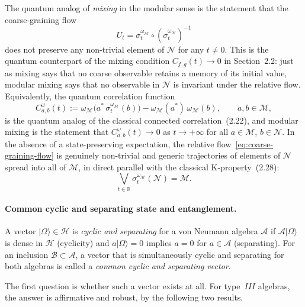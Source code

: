 \documentclass[a4paper,11pt]{article}
\theoremstyle{definition}
\begin{document}
The quantum analog of \emph{mixing} in the modular sense is the statement that the
coarse-graining flow
\begin{equation}
  U_t = \sigma_t^{\omega_\mathcal{M}}\circ(\sigma_t^{\omega_\mathcal{N}})^{-1}
  \label{eq:coarse-graining-flow}
\end{equation}
does not preserve any non-trivial element of $\mathcal{N}$ for any $t\neq 0$.  This is
the quantum counterpart of the mixing condition $C_{f,g}(t)\to 0$ in Section~2.2: just
as mixing says that no coarse observable retains a memory of its initial value, modular
mixing says that no observable in $\mathcal{N}$ is invariant under the relative flow.
Equivalently, the quantum correlation function
\begin{equation}
  C_{a,b}^{\omega}(t) := \omega_\mathcal{M}\bigl(a^*\,\sigma_t^{\omega_\mathcal{M}}(b)\bigr)
  - \omega_\mathcal{M}(a^*)\,\omega_\mathcal{M}(b),
  \qquad a,b\in\mathcal{M},
  \label{eq:quantum-correlation}
\end{equation}
is the quantum analog of the classical connected correlation~(2.22), and modular mixing
is the statement that $C_{a,b}^\omega(t)\to 0$ as $t\to+\infty$ for all
$a\in\mathcal{M}$, $b\in\mathcal{N}$.  In the absence of a state-preserving expectation,
the relative flow~\eqref{eq:coarse-graining-flow} is genuinely non-trivial and generic
trajectories of elements of $\mathcal{N}$ spread into all of $\mathcal{M}$,
in direct parallel with the classical K-property~(2.28):
\begin{equation}
  \bigvee_{t\in\mathbb{R}}\sigma_t^{\omega_\mathcal{M}}(\mathcal{N}) = \mathcal{M}.
  \label{eq:topological-transitivity}
\end{equation}

\paragraph{Common cyclic and separating state and entanglement.}
A vector $|\Omega\rangle\in\mathcal{H}$ is \emph{cyclic and separating} for a von Neumann
algebra $\mathcal{A}$ if $\mathcal{A}|\Omega\rangle$ is dense in $\mathcal{H}$ (cyclicity)
and $a|\Omega\rangle=0$ implies $a=0$ for $a\in\mathcal{A}$ (separating).  For an
inclusion $\mathcal{B}\subset\mathcal{A}$, a vector that is simultaneously cyclic and
separating for both algebras is called a \emph{common cyclic and separating vector}.

The first question is whether such a vector exists at all.  For type~$III$ algebras,
the answer is affirmative and robust, by the following two results.
\end{document}

